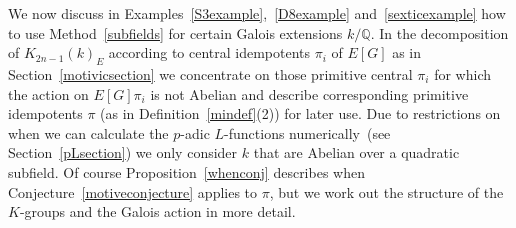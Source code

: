 \documentclass{amsart}
\begin{document}
We now discuss in Examples~\ref{S3example},~\ref{D8example} and~\ref{sexticexample} how
to use Method~\ref{subfields} for certain Galois extensions $ k/{\mathbb Q} $.
In the decomposition of $ {K_{2n-1}(k)_E}$ according to central idempotents $ \pi_i $ of $ E[G] $
as in Section~\ref{motivicsection} we concentrate on
those primitive central $ \pi_i $ for which the action on $ E[G]\pi_i $ is not Abelian and
describe corresponding primitive idempotents $ \pi $ (as in Definition~\ref{mindef}(2)) for later
use.
Due to restrictions on when we can calculate the {$p$-adic{\futurelet{}}} {$L$-functions{\futurelet{}}} numerically~(see Section~\ref{pLsection})
we only consider $ k $ that are Abelian over a quadratic subfield.
Of course Proposition~\ref{whenconj} describes when Conjecture~\ref{motiveconjecture}
applies to $ \pi $, but we work out the structure of the $ K $-groups and the Galois action in
more detail.
\end{document}
